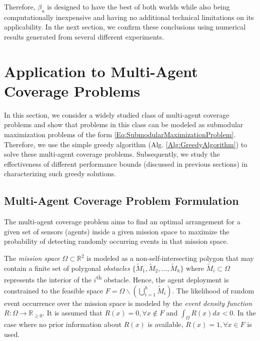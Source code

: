 \documentclass[conference]{IEEEtran}
\newcommand{\R}{\mathbb{R}}
\begin{document}
Therefore, $\beta_u$ is designed to have the best of both worlds while also being computationally inexpensive and having no additional technical limitations on its applicability. In the next section, we confirm these conclusions using numerical results generated from several different experiments. 





\section{Application to Multi-Agent Coverage Problems}
\label{Sec:ApplicationToCoverageProblem}




In this section, we consider a widely studied class of multi-agent coverage problems \cite{Zhong2011,Sun2019,Welikala2019J1} and show that problems in this class can be modeled as submodular maximization problems of the form \eqref{Eq:SubmodularMaximizationProblem}. Therefore, we use the simple greedy algorithm (Alg. \ref{Alg:GreedyAlgorithm}) to solve these multi-agent coverage problems. Subsequently, we study the effectiveness of different performance bounds (discussed in previous sections) in characterizing such greedy solutions.



\subsection{Multi-Agent Coverage Problem Formulation}

The multi-agent coverage problem aims to find an optimal arrangement for a given set of sensors (agents) inside a given mission space to maximize the probability of detecting randomly occurring events in that mission space. 

The \emph{mission space} $\Omega\subset \R^2$ is modeled as a non-self-intersecting polygon \cite{Zhong2011} that may contain a finite set of polygonal \emph{obstacles} $\{\tilde{M}_1,\tilde{M}_2,\ldots,\tilde{M}_h\}$ where $\tilde{M}_i\subset \Omega$ represents the interior of the $i$\textsuperscript{th} obstacle. Hence, the agent deployment is constrained to the feasible space $F=\Omega \backslash (\bigcup_{i=1}^h \tilde{M}_i)$. The likelihood of random event occurrence over the mission space is modeled by the \emph{event density function} $R:\Omega\rightarrow \R_{\geq0}$. It is assumed that $R(x)=0, \forall x\not\in F$ and $\int_{\Omega}R(x)dx<0$. In the case where no prior information about $R(x)$ is available, $R(x)=1, \forall x \in F$ is used. 
\end{document}
